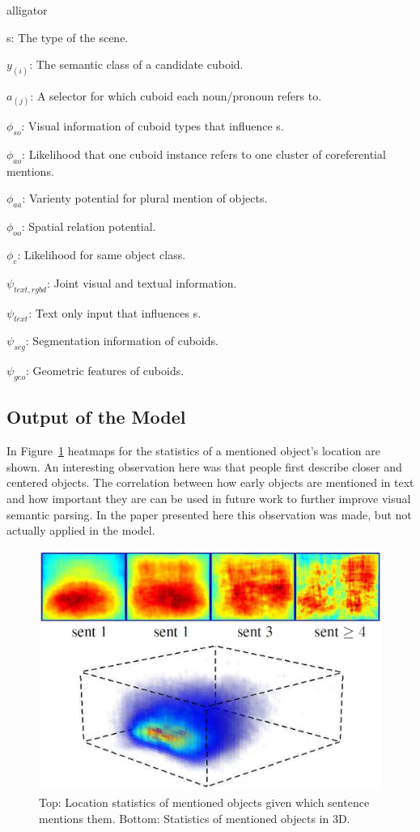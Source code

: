 \documentclass{utue} %
\begin{document}
\begin{labeling}{alligator}
\item [s:]    The type of the scene.
\item [$y_{(i)}$:]    The semantic class of a candidate cuboid.
\item [$a_{(j)}$:]    A selector for which cuboid each noun/pronoun refers to.
\item [$\phi_{so}$:]  Visual information of cuboid types that influence s. 
\item [$\phi_{ao}$:]    Likelihood that one cuboid instance refers to one cluster of coreferential mentions.
\item [$\phi_{aa}$:]   Varienty potential for plural mention of objects.
\item [$\phi_{oo}$:]    Spatial relation potential.
\item [$\phi_{c}$:]    Likelihood for same object class.
\item [$\psi_{text, rgbd}$:] Joint visual and textual information.
\item [$\psi_{text}$:]    Text only input that influences s.
\item [$\psi_{seg}$:] Segmentation information of cuboids.
\item [$\psi_{geo}$:] Geometric features of cuboids.
\end{labeling}

\subsection{Output of the Model}

In Figure~\ref{fig:results} heatmaps for the statistics of a mentioned object's location are shown. An interesting observation here was that people first describe closer and centered objects. The correlation between how early objects are mentioned in text and how important they are can be used in future work to further improve visual semantic parsing. In the paper presented here this observation was made, but not actually applied in the model.

\begin{figure}[h!]
  \centering
  \includegraphics[width=.9\columnwidth]{images/results.jpg}
  \caption{\label{fig:results}Top: Location statistics of mentioned objects given which sentence mentions them. Bottom: Statistics of mentioned objects in 3D.}
\end{figure}
\end{document}

